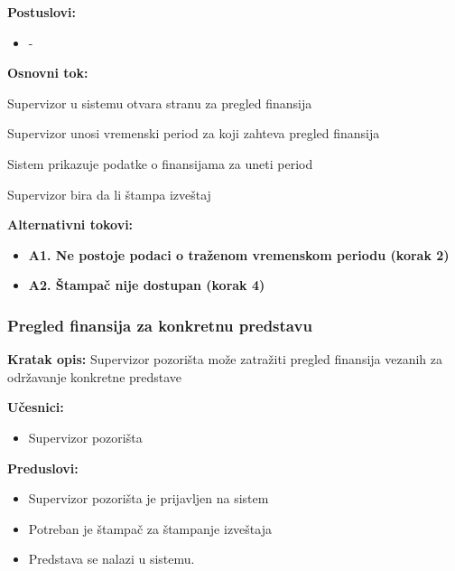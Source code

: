 \documentclass[a4paper]{article}
\begin{document}
\noindent\textbf{Postuslovi:} 
\begin{itemize}
  \item -
\end{itemize}

\noindent\textbf{Osnovni tok:} 
\begin{legal}
  \item Supervizor u sistemu otvara stranu za pregled finansija
  \item Supervizor unosi vremenski period za koji zahteva pregled finansija
  \item Sistem prikazuje podatke o finansijama za uneti period
  \item Supervizor bira da li štampa izveštaj
\end{legal}

\noindent\textbf{Alternativni tokovi:}
\begin{itemize}
  \item \textbf{A1. Ne postoje podaci o traženom vremenskom periodu (korak 2)} 

  \item \textbf{A2. Štampač nije dostupan (korak 4)} 
\end{itemize}

\subsubsection{Pregled finansija za konkretnu predstavu}
\noindent\textbf{Kratak opis:} Supervizor pozorišta može zatražiti pregled finansija vezanih za održavanje konkretne predstave

\noindent\textbf{Učesnici:} 
\begin{itemize}
  \item Supervizor pozorišta
\end{itemize}

\noindent\textbf{Preduslovi:} 
\begin{itemize}
  \item Supervizor pozorišta je prijavljen na sistem
  \item Potreban je štampač za štampanje izveštaja
  \item Predstava se nalazi u sistemu.
\end{itemize}
\end{document}
